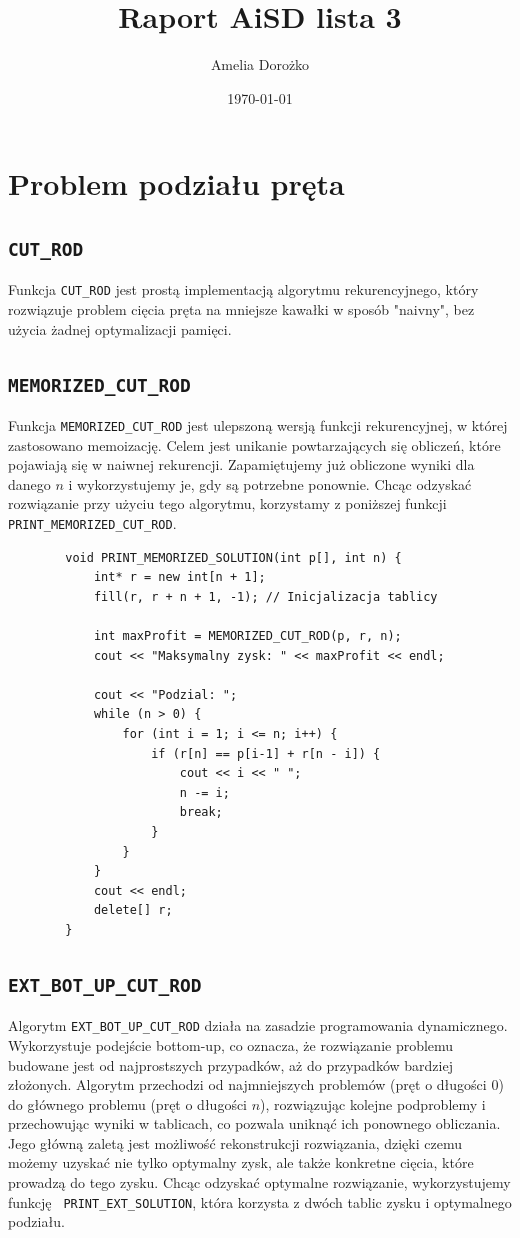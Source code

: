 \documentclass{article}
\begin{document}
	\title{Raport AiSD lista 3}
	\author{Amelia Dorożko}
	\date{\today}
	\maketitle
	
	\section{Problem podziału pręta}
	
	\subsection{\texttt{CUT\_ROD}}
	Funkcja \texttt{CUT\_ROD} jest prostą implementacją algorytmu rekurencyjnego, który rozwiązuje problem cięcia pręta na mniejsze kawałki w sposób "naivny", bez użycia żadnej optymalizacji pamięci.
	
	\subsection{\texttt{MEMORIZED\_CUT\_ROD}}
	Funkcja \texttt{MEMORIZED\_CUT\_ROD} jest ulepszoną wersją funkcji rekurencyjnej, w której zastosowano memoizację. Celem jest unikanie powtarzających się obliczeń, które pojawiają się w naiwnej rekurencji. Zapamiętujemy już obliczone wyniki dla danego $n$ i wykorzystujemy je, gdy są potrzebne ponownie. Chcąc odzyskać rozwiązanie przy użyciu tego algorytmu, korzystamy z poniższej funkcji \texttt{PRINT\_MEMORIZED\_CUT\_ROD}.
	
	\begin{lstlisting}
		void PRINT_MEMORIZED_SOLUTION(int p[], int n) {
			int* r = new int[n + 1];
			fill(r, r + n + 1, -1); // Inicjalizacja tablicy
			
			int maxProfit = MEMORIZED_CUT_ROD(p, r, n);
			cout << "Maksymalny zysk: " << maxProfit << endl;
			
			cout << "Podzial: ";
			while (n > 0) {
				for (int i = 1; i <= n; i++) {
					if (r[n] == p[i-1] + r[n - i]) {
						cout << i << " ";
						n -= i;
						break;
					}
				}
			}
			cout << endl;
			delete[] r;
		}
	\end{lstlisting}
	
	\subsection{\texttt{EXT\_BOT\_UP\_CUT\_ROD}}
	Algorytm \texttt{EXT\_BOT\_UP\_CUT\_ROD} działa na zasadzie programowania dynamicznego. Wykorzystuje podejście bottom-up, co oznacza, że rozwiązanie problemu budowane jest od najprostszych przypadków, aż do przypadków bardziej złożonych. Algorytm przechodzi od najmniejszych problemów (pręt o długości 0) do głównego problemu (pręt o długości $n$), rozwiązując kolejne podproblemy i przechowując wyniki w tablicach, co pozwala uniknąć ich ponownego obliczania. Jego główną zaletą jest możliwość rekonstrukcji rozwiązania, dzięki czemu możemy uzyskać nie tylko optymalny zysk, ale także konkretne cięcia, które prowadzą do tego zysku. Chcąc odzyskać optymalne rozwiązanie, wykorzystujemy funkcję \texttt{ PRINT\_EXT\_SOLUTION}, która korzysta z dwóch tablic zysku i optymalnego podziału.
	
\end{document}
